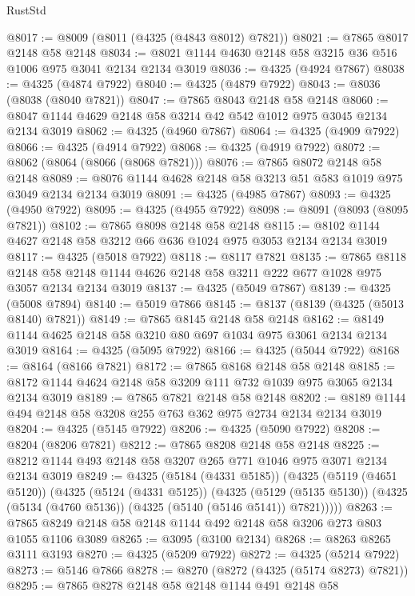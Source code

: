 \begin{lexlean}{RustStd}
\begin{coremodule}
@8017 := @8009 (@8011 (@4325 (@4843 @8012) @7821))
@8021 := @7865 @8017 @2148 @58 @2148
@8034 := @8021 @1144 @4630 @2148 @58 @3215 @36 @516 @1006 @975 @3041 @2134 @2134 @3019
@8036 := @4325 (@4924 @7867)
@8038 := @4325 (@4874 @7922)
@8040 := @4325 (@4879 @7922)
@8043 := @8036 (@8038 (@8040 @7821))
@8047 := @7865 @8043 @2148 @58 @2148
@8060 := @8047 @1144 @4629 @2148 @58 @3214 @42 @542 @1012 @975 @3045 @2134 @2134 @3019
@8062 := @4325 (@4960 @7867)
@8064 := @4325 (@4909 @7922)
@8066 := @4325 (@4914 @7922)
@8068 := @4325 (@4919 @7922)
@8072 := @8062 (@8064 (@8066 (@8068 @7821)))
@8076 := @7865 @8072 @2148 @58 @2148
@8089 := @8076 @1144 @4628 @2148 @58 @3213 @51 @583 @1019 @975 @3049 @2134 @2134 @3019
@8091 := @4325 (@4985 @7867)
@8093 := @4325 (@4950 @7922)
@8095 := @4325 (@4955 @7922)
@8098 := @8091 (@8093 (@8095 @7821))
@8102 := @7865 @8098 @2148 @58 @2148
@8115 := @8102 @1144 @4627 @2148 @58 @3212 @66 @636 @1024 @975 @3053 @2134 @2134 @3019
@8117 := @4325 (@5018 @7922)
@8118 := @8117 @7821
@8135 := @7865
    @8118
    @2148
    @58
    @2148
    @1144
    @4626
    @2148
    @58
    @3211
    @222
    @677
    @1028
    @975
    @3057
    @2134
    @2134
    @3019
@8137 := @4325 (@5049 @7867)
@8139 := @4325 (@5008 @7894)
@8140 := @5019 @7866
@8145 := @8137 (@8139 (@4325 (@5013 @8140) @7821))
@8149 := @7865 @8145 @2148 @58 @2148
@8162 := @8149 @1144 @4625 @2148 @58 @3210 @80 @697 @1034 @975 @3061 @2134 @2134 @3019
@8164 := @4325 (@5095 @7922)
@8166 := @4325 (@5044 @7922)
@8168 := @8164 (@8166 @7821)
@8172 := @7865 @8168 @2148 @58 @2148
@8185 := @8172 @1144 @4624 @2148 @58 @3209 @111 @732 @1039 @975 @3065 @2134 @2134 @3019
@8189 := @7865 @7821 @2148 @58 @2148
@8202 := @8189 @1144 @494 @2148 @58 @3208 @255 @763 @362 @975 @2734 @2134 @2134 @3019
@8204 := @4325 (@5145 @7922)
@8206 := @4325 (@5090 @7922)
@8208 := @8204 (@8206 @7821)
@8212 := @7865 @8208 @2148 @58 @2148
@8225 := @8212 @1144 @493 @2148 @58 @3207 @265 @771 @1046 @975 @3071 @2134 @2134 @3019
@8249 := @4325
    (@5184 (@4331 @5185))
    (@4325
      (@5119 (@4651 @5120))
      (@4325
        (@5124 (@4331 @5125))
        (@4325
          (@5129 (@5135 @5130))
          (@4325 (@5134 (@4760 @5136)) (@4325 (@5140 (@5146 @5141)) @7821)))))
@8263 := @7865 @8249 @2148 @58 @2148 @1144 @492 @2148 @58 @3206 @273 @803 @1055 @1106 @3089
@8265 := @3095 (@3100 @2134)
@8268 := @8263 @8265 @3111 @3193
@8270 := @4325 (@5209 @7922)
@8272 := @4325 (@5214 @7922)
@8273 := @5146 @7866
@8278 := @8270 (@8272 (@4325 (@5174 @8273) @7821))
@8295 := @7865
    @8278
    @2148
    @58
    @2148
    @1144
    @491
    @2148
    @58

\end{coremodule}
\end{lexlean}
